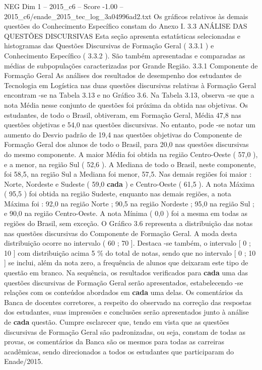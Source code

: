 \begin{textsample}{NEG Dim 1 – 2015\_c6 – Score -1.00 – 2015\_c6/enade\_2015\_tec\_log\_3a04996ad2.txt}
Os gráficos relativos às demais questões do Conhecimento Específico constam do Anexo I. 3.3 ANÁLISE DAS QUESTÕES DISCURSIVAS Esta seção apresenta estatísticas selecionadas e histogramas das Questões Discursivas de Formação Geral ( 3.3.1 ) e Conhecimento Específico ( 3.3.2 ).
São também apresentadas e comparadas as médias de subpopulações caracterizadas por Grande Região. 3.3.1 Componente de Formação Geral As análises dos resultados de desempenho dos estudantes de Tecnologia em Logística nas duas questões discursivas relativas à Formação Geral encontram -se na Tabela 3.13 e no Gráfico 3.6.
Na Tabela 3.13, observa -se que a nota Média nesse conjunto de questões foi próxima da obtida nas objetivas.
Os estudantes, de todo o Brasil, obtiveram, em Formação Geral, Média 47,8 nas questões objetivas e 54,0 nas questões discursivas.
No entanto, pode -se notar um aumento do Desvio padrão de 19,4 nas questões objetivas do Componente de Formação Geral dos alunos de todo o Brasil, para 20,0 nas questões discursivas do mesmo componente.
A maior Média foi obtida na região Centro-Oeste ( 57,0 ), e a menor, na região Sul ( 52,6 ).
A Mediana de todo o Brasil, neste componente, foi 58,5, na região Sul a Mediana foi menor, 57,5.
Nas demais regiões foi maior : Norte, Nordeste e Sudeste ( 59,0 \textbf{cada} ) e Centro-Oeste ( 61,5 ).
A nota Máxima ( 95,5 ) foi obtida na região Sudeste, enquanto nas demais regiões, a nota Máxima foi : 92,0 na região Norte ; 90,5 na região Nordeste ; 95,0 na região Sul ; e 90,0 na região Centro-Oeste.
A nota Mínima ( 0,0 ) foi a mesma em todas as regiões do Brasil, sem exceção.
O Gráfico 3.6 representa a distribuição das notas nas questões discursivas do Componente de Formação Geral.
A moda desta distribuição ocorre no intervalo ( 60 ; 70 ].
Destaca -se também, o intervalo [ 0 ; 10 ] com distribuição acima 5 \% do total de notas, sendo que no intervalo [ 0 ; 10 ] se inclui, além da nota zero, a frequência de alunos que deixaram este tipo de questão em branco.
Na sequência, os resultados verificados para \textbf{cada} uma das questões discursivas de Formação Geral serão apresentados, estabelecendo -se relações com os conteúdos abordados em \textbf{cada} uma delas.
Os comentários da Banca de docentes corretores, a respeito do observado na correção das respostas dos estudantes, suas impressões e conclusões serão apresentados junto à análise de \textbf{cada} questão.
Cumpre esclarecer que, tendo em vista que as questões discursivas de Formação Geral são padronizadas, ou seja, constam de todas as provas, os comentários da Banca são os mesmos para todas as carreiras acadêmicas, sendo direcionados a todos os estudantes que participaram do Enade/2015.

\end{textsample}
